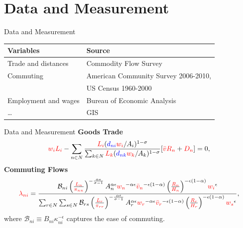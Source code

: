 \documentclass{beamer}
\begin{document}
\section{Data and Measurement}
\begin{frame}[shrink]
	\transfade %
	\tableofcontents[sectionstyle=show/shaded,subsectionstyle=show/shaded/hide]
	\addtocounter{framenumber}{-1}
\end{frame}
\begin{frame}{Data and Measurement}
	\begin{table}[]
		\begin{tabular}{ll}
		\hline \hline
		Variables    & Source      \\ \hline
		Trade and distances & Commodity Flow Survey    \\
		Commuting      & American Community Survey 2006-2010, \\
		& US Census 1960-2000  \\ 
		Employment and wages     & Bureau of Economic Analysis \\ 
		\dots  & GIS     \\ \hline
		\end{tabular}
	\end{table}
\end{frame}
\begin{frame}{Data and Measurement}
	\textbf{Goods Trade}
	\begin{equation}
		\textcolor{red}{w_iL_i}-\sum_{n\in N} \frac{\textcolor{red}{L_i}(\textcolor{blue}{d_{ni}}\textcolor{red}{w_i}/A_i)^{1-\sigma}}{\sum_{k\in N}\textcolor{red}{L_k}(\textcolor{blue}{d_{nk}}\textcolor{red}{w_k}/A_k)^{1-\sigma}}[\textcolor{red}{\bar{v}R_n}+\textcolor{red}{D_n}] = 0,
	\end{equation}
	\textbf{Commuting Flows}
	\begin{equation}
		\textcolor{red}{\lambda_{ni}} = \frac{\mathcal{B}_{ni}\left(\frac{\textcolor{red}{L_n}}{\textcolor{red}{\pi_{nn}}}\right)^{-\frac{\alpha\epsilon}{\sigma-1}}A_n^{\alpha\epsilon}\textcolor{red}{w_n}^{-\alpha\epsilon}\textcolor{red}{\bar{v}_n}^{-\epsilon(1-\alpha)}\left(\frac{\textcolor{red}{R_n}}{\textcolor{red}{H_n}}\right)^{-\epsilon(1-\alpha)}\textcolor{red}{w_i}^{\epsilon}}
		{\sum_{r\in N}\sum_{s\in N}\mathcal{B}_{rs}\left(\frac{\textcolor{red}{L_r}}{\textcolor{red}{\pi_{rr}}}\right)^{-\frac{\alpha\epsilon}{\sigma-1}}A_r^{\alpha\epsilon}\textcolor{red}{w_r}^{-\alpha\epsilon}\textcolor{red}{\bar{v}_r}^{-\epsilon(1-\alpha)}\left(\frac{\textcolor{red}{R_r}}{\textcolor{red}{H_r}}\right)^{-\epsilon(1-\alpha)}\textcolor{red}{w_s}^{\epsilon}},
	\end{equation}
	where $\mathcal{B}_{ni}\equiv B_{ni}\kappa_{ni}^{-\epsilon}$ captures the ease of commuting.
\end{frame}
\end{document}
